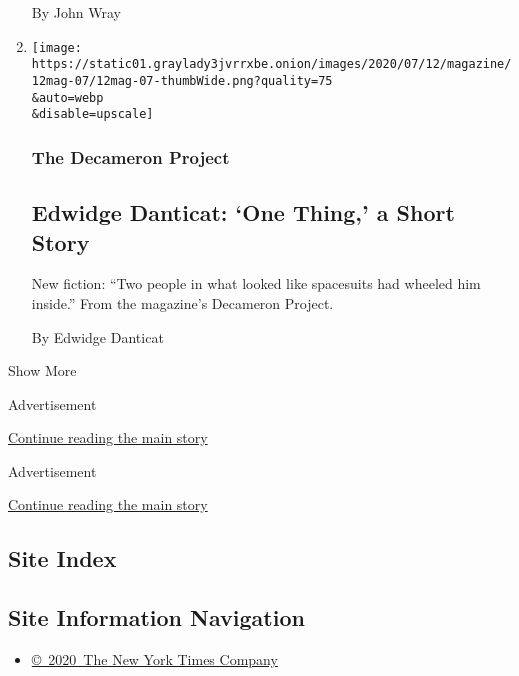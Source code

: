 \begin{enumerate}
  By John Wray
\item
  \href{/interactive/2020/07/07/magazine/edwidge-danticat-decameron.html}{}

  \texttt{[image: https://static01.graylady3jvrrxbe.onion/images/2020/07/12/magazine/12mag-07/12mag-07-thumbWide.png?quality=75\\\&auto=webp\\\&disable=upscale]}

  \hypertarget{the-decameron-project-15}{%
  \subsubsection{The Decameron Project}\label{the-decameron-project-15}}

  \hypertarget{edwidge-danticat-one-thing-a-short-story}{%
  \subsection{Edwidge Danticat: `One Thing,' a Short
  Story}\label{edwidge-danticat-one-thing-a-short-story}}

  New fiction: ``Two people in what looked like spacesuits had wheeled
  him inside.'' From the magazine's Decameron Project.

  By Edwidge Danticat
\end{enumerate}

Show More

Advertisement

\protect\hyperlink{after-mid2}{Continue reading the main story}

Advertisement

\protect\hyperlink{after-mktg}{Continue reading the main story}

\hypertarget{site-index}{%
\subsection{Site Index}\label{site-index}}

\hypertarget{site-information-navigation}{%
\subsection{Site Information
Navigation}\label{site-information-navigation}}

\begin{itemize}
\tightlist
\item
  \href{https://help.nytimes3xbfgragh.onion/hc/en-us/articles/115014792127-Copyright-notice}{©~2020~The
  New York Times Company}
\end{itemize}

